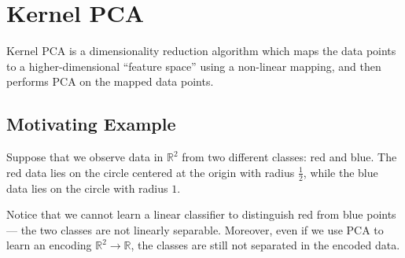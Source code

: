 \documentclass[]{article}
\newcommand{\reals}{\mathbb{R}}
\begin{document}
\section{Kernel PCA}

Kernel PCA \cite{scholkopf1997} is a dimensionality reduction algorithm which maps the data points to a higher-dimensional ``feature space'' using a non-linear mapping, and then performs PCA on the mapped data points. 

\subsection{Motivating Example}
Suppose that we observe data in $\reals^2$ from two different classes: red and blue.
The red data lies on the circle centered at the origin with radius $\frac{1}{2}$, while the blue data lies on the circle with radius $1$.

Notice that we cannot learn a linear classifier to distinguish red from blue points --- the two classes are not linearly separable.
Moreover, even if we use PCA to learn an encoding $\reals^2 \to \reals$, the classes are still not separated in the encoded data.
\end{document}
